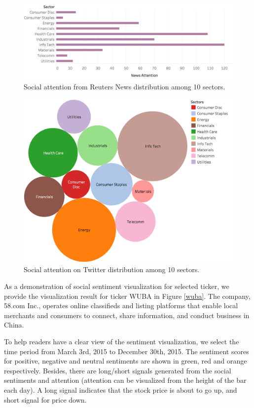 \documentclass[conference]{IEEEtran}
\begin{document}
\begin{figure}[t]
\centerline{\includegraphics[width=\columnwidth]{pics/newsAttention.png}}
\caption{Social attention from Reuters News distribution among 10 sectors.}
\label{sectorNews}
\end{figure}

\begin{figure}[t]
\centerline{\includegraphics[width=0.8\columnwidth]{pics/sectorImage.png}}
\caption{Social attention on Twitter distribution among 10 sectors.}
\label{sectorTwitter}
\end{figure}

As a demonstration of social sentiment visualization for selected ticker, we provide the visualization result for ticker WUBA in Figure \ref{wuba}. The company, 58.com Inc., operates online classifieds and listing platforms that enable local merchants and consumers to connect, share information, and conduct business in China.

To help readers have a clear view of the sentiment visualization, we select the time period from March 3rd, 2015 to December 30th, 2015. The sentiment scores for positive, negative and neutral sentiments are shown in green, red and orange respectively. Besides, there are long/short signals generated from the social sentiments and attention (attention can be visualized from the height of the bar each day). A long signal indicates that the stock price is about to go up, and short signal for price down. 
\end{document}
